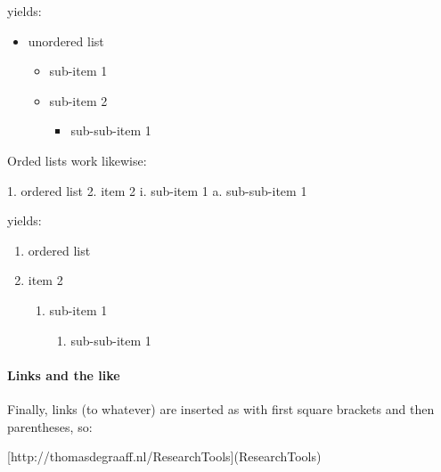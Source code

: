 \documentclass[]{article}
\newenvironment{Shaded}{\begin{snugshade}}{\end{snugshade}}
\newcommand{\FloatTok}[1]{\textcolor[rgb]{0.00,0.00,0.81}{#1}}
\newcommand{\OtherTok}[1]{\textcolor[rgb]{0.56,0.35,0.01}{#1}}
\newcommand{\NormalTok}[1]{#1}
\providecommand{\tightlist}{%
  \setlength{\itemsep}{0pt}\setlength{\parskip}{0pt}}
\let\oldparagraph\paragraph
\renewcommand{\paragraph}[1]{\oldparagraph{#1}\mbox{}}
\theoremstyle{definition}
\theoremstyle{definition}
\theoremstyle{definition}
\theoremstyle{remark}
\begin{document}
yields:

\begin{itemize}
\tightlist
\item
  unordered list

  \begin{itemize}
  \tightlist
  \item
    sub-item 1
  \item
    sub-item 2

    \begin{itemize}
    \tightlist
    \item
      sub-sub-item 1
    \end{itemize}
  \end{itemize}
\end{itemize}

Orded lists work likewise:

\begin{Shaded}
\begin{Highlighting}[]
\NormalTok{1. }\FloatTok{ordered list}
\FloatTok{2. item 2}
\FloatTok{    i. sub-item 1}
\FloatTok{        a. sub-sub-item 1 }
\end{Highlighting}
\end{Shaded}

yields:

\begin{enumerate}
\def\labelenumi{\arabic{enumi}.}
\tightlist
\item
  ordered list
\item
  item 2

  \begin{enumerate}
  \def\labelenumii{\roman{enumii}.}
  \tightlist
  \item
    sub-item 1

    \begin{enumerate}
    \def\labelenumiii{\alph{enumiii}.}
    \tightlist
    \item
      sub-sub-item 1
    \end{enumerate}
  \end{enumerate}
\end{enumerate}

\paragraph{Links and the like}\label{links-and-the-like}

Finally, links (to whatever) are inserted as with first square brackets
and then parentheses, so:

\begin{Shaded}
\begin{Highlighting}[]
\OtherTok{[http://thomasdegraaff.nl/ResearchTools](ResearchTools)}
\end{Highlighting}
\end{Shaded}
\end{document}

